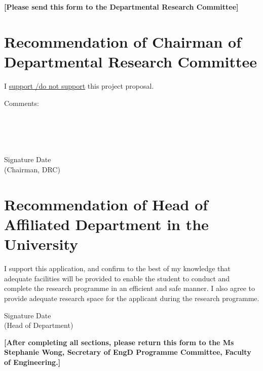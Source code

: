 \documentclass[
  11pt,
  a4paper,
  oneside
]{article}
\begin{document}
\textbf{\normalsize[Please send this form to the Departmental Research Committee]}\\

\vspace{4ex}

\section{Recommendation of Chairman of Departmental Research Committee}

\vspace{5ex}

I \uline{support \slash do not support}  this project proposal.\\

\vspace{2ex}

Comments:
\uline{\phantom{x}\hfill}\\
\uline{\phantom{x}\hfill}\\
\uline{\phantom{x}\hfill}\\
\uline{\phantom{x}\hfill}\\
\uline{\phantom{x}\hfill}\\

\vspace{8ex}

Signature \uline{\hfill}  Date \uline{\phantom{xxxxxxxxxxxxxxxxxxxxxxxxxxxxxxxxxx}}\\
\phantom{xxxxxxxxxxxxxxxxxxxxxxxxx}(Chairman, DRC)\\

\vspace{5ex}

\section{Recommendation of Head of Affiliated Department in the University}

\vspace{5ex}

I support this application, and confirm to the best of my knowledge that adequate facilities will be provided to enable the student to conduct and complete the research programme in an efficient and safe manner. I also agree to provide adequate research space for the applicant during the research programme.

\vspace{8ex}

Signature \uline{\hfill}  Date \uline{\phantom{xxxxxxxxxxxxxxxxxxxxxxxxxxxxxxxxxx}}\\
\phantom{xxxxxxxxxxxxxxxxxxxxxx}(Head of Department)\\

\vfill

\textbf{\normalsize[After completing all sections, please return this form to the Ms Stephanie Wong, Secretary of EngD Programme Committee, Faculty of Engineering.]}
\end{document}

